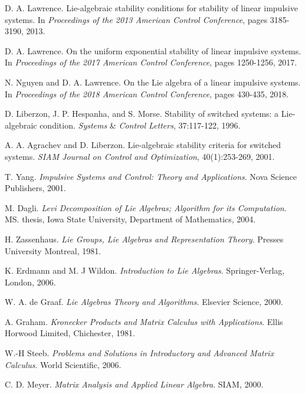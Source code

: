\documentclass[11pt,a4paper]{article}
\begin{document}
\pagebreak
\begin{thebibliography}{}

D. A. Lawrence.
Lie-algebraic stability conditions for stability of linear impulsive systems.
In \textit{Proceedings of the 2013 American Control Conference}, pages 3185-3190, 2013.

D. A. Lawrence.
On the uniform exponential stability of linear impulsive systems.
In \textit{Proceedings of the 2017 American Control Conference}, pages 1250-1256, 2017.

N. Nguyen and D. A. Lawrence.
On the Lie algebra of a linear impulsive systems.
In \textit{Proceedings of the 2018 American Control Conference}, pages 430-435, 2018.
 
D. Liberzon, J. P. Hespanha, and S. Morse.
Stability of switched systems: a Lie-algebraic condition. 
\textit{Systems} \& \textit{Control Letters}, 37:117-122, 1996.

A. A. Agrachev and D. Liberzon.
Lie-algebraic stability criteria for switched systems. 
\textit{SIAM Journal on Control and Optimization}, 40(1):253-269, 2001.

T. Yang.
\textit{Impulsive Systems and Control: Theory and Applications}.
Nova Science Publishers, 2001.

M. Dagli.
\textit{Levi Decomposition of Lie Algebras; Algorithm for its Computation}.
MS. thesis, Iowa State University, Department of Mathematics, 2004.

H. Zassenhaus.
\textit{Lie Groups, Lie Algebras and Representation Theory}.
Presses University Montreal, 1981.

K. Erdmann and M. J Wildon.
\textit{Introduction to Lie Algebras}.
Springer-Verlag, London, 2006.

W. A. de Graaf.
\textit{Lie Algebras Theory and Algorithms}.
Elsevier Science, 2000.

A. Graham. 
\textit{Kronecker Products and Matrix Calculus with Applications}.
Ellis Horwood Limited, Chichester, 1981.

W.-H Steeb. 
\textit{Problems and Solutions in Introductory and Advanced Matrix Calculus}.
World Scientific, 2006.

C. D. Meyer.
\textit{Matrix Analysis and Applied Linear Algebra}. 
SIAM, 2000.

\end{thebibliography}
\end{document}
